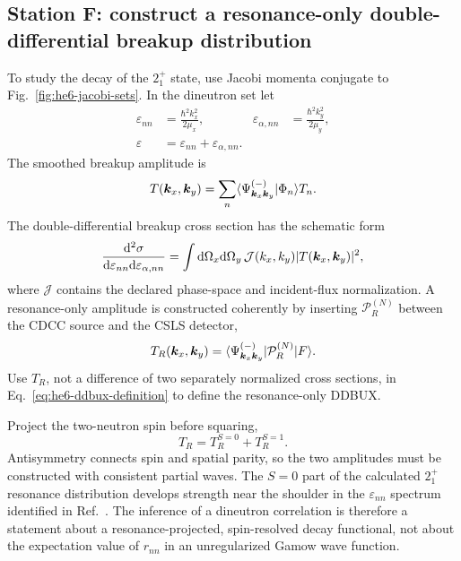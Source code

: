 \subsection{Station F: construct a resonance-only double-differential breakup distribution}
\label{subsec:he6-ddbux}

To study the decay of the $2_1^+$ state, use Jacobi momenta conjugate to
Fig.~\ref{fig:he6-jacobi-sets}.  In the dineutron set let
\begin{align}
  \varepsilon_{nn}
  &=\frac{\hbar^2k_x^2}{2\mu_x},
  &
  \varepsilon_{\alpha,nn}
  &=\frac{\hbar^2k_y^2}{2\mu_y},
  \label{eq:he6-jacobi-energies}\\
  \varepsilon
  &=\varepsilon_{nn}+\varepsilon_{\alpha,nn}.
  \label{eq:he6-total-internal-energy}
\end{align}
The smoothed breakup amplitude is
\begin{equation}
  T(\bm k_x,\bm k_y)
  =\sum_n
  \langle \Psi_{\bm k_x\bm k_y}^{(-)}|\Phi_n \rangle T_n.
  \label{eq:he6-three-body-breakup-amplitude}
\end{equation}
The double-differential breakup cross section has the schematic form
\begin{equation}
  \frac{\mathrm{d}^2\sigma}
  {\mathrm{d}\varepsilon_{nn}\mathrm{d}\varepsilon_{\alpha,nn}}
  =\int\mathrm{d}\Omega_x\mathrm{d}\Omega_y\,
  \mathcal J(k_x,k_y)
  |T(\bm k_x,\bm k_y)|^2,
  \label{eq:he6-ddbux-definition}
\end{equation}
where $\mathcal J$ contains the declared phase-space and incident-flux
normalization.  A resonance-only amplitude is constructed coherently by
inserting $\mathcal P_R^{(N)}$ between the CDCC source and the CSLS detector,
\begin{equation}
  T_R(\bm k_x,\bm k_y)
  =\langle \Psi_{\bm k_x\bm k_y}^{(-)} \rvert
  \mathcal P_R^{(N)}\lvert F \rangle.
  \label{eq:he6-resonance-only-amplitude}
\end{equation}
Use $T_R$, not a difference of two separately normalized cross sections, in
Eq.~\eqref{eq:he6-ddbux-definition} to define the resonance-only DDBUX.

Project the two-neutron spin before squaring,
\begin{equation}
  T_R=T_R^{S=0}+T_R^{S=1}.
  \label{eq:he6-spin-amplitude-decomposition}
\end{equation}
Antisymmetry connects spin and spatial parity, so the two amplitudes must be
constructed with consistent partial waves.  The $S=0$ part of the calculated
$2_1^+$ resonance distribution develops strength near the shoulder in the
$\varepsilon_{nn}$ spectrum identified in
Ref.~\cite{arXiv:2111.04285}.  The inference of a dineutron correlation is
therefore a statement about a resonance-projected, spin-resolved decay
functional, not about the expectation value of $r_{nn}$ in an
unregularized Gamow wave function.

